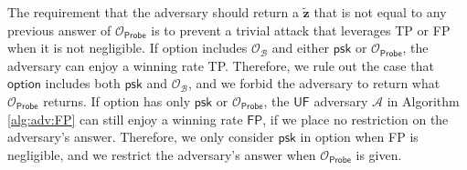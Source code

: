 The requirement that the adversary should return a $\mathbf{\tilde{z}}$ that is not equal to any previous answer of $\mathcal{O}_\textsf{Probe}$ is to prevent a trivial attack that leverages \textsf{TP} or \textsf{FP} when it is not negligible. If \textsf{option} includes $\mathcal{O}_\mathcal{B}$ and either $\textsf{psk}$ or $\mathcal{O}_\textsf{Probe}$, the adversary can enjoy a winning rate \textsf{TP}. Therefore, we rule out the case that $\textsf{option}$ includes both $\textsf{psk}$ and $\mathcal{O}_\mathcal{B}$, and we forbid the adversary to return what $\mathcal{O}_\textsf{Probe}$ returns.
If \textsf{option} has only $\textsf{psk}$ or $\mathcal{O}_\textsf{Probe}$, the $\textsf{UF}$ adversary $\mathcal{A}$ in Algorithm \ref{alg:adv:FP} can still enjoy a winning rate $\textsf{FP}$, if we place no restriction on the adversary's answer. Therefore, we only consider $\textsf{psk}$ in \textsf{option} when \textsf{FP} is negligible, and we restrict the adversary's answer when $\mathcal{O}_\textsf{Probe}$ is given.


 


